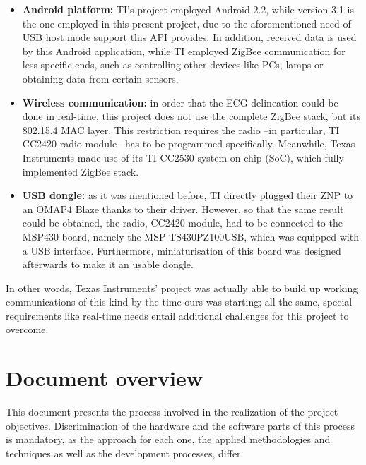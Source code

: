 \begin{itemize}
\begin{itemize}
					\item \textbf{Android platform:} TI's project employed Android 2.2, while version 3.1 is the
						one employed in this present project, due to the aforementioned need of USB host mode support 
						this API provides. In addition, received data is used by this Android application, while TI
						employed ZigBee communication for less specific ends, such as controlling other devices
						like PCs, lamps or obtaining data from certain sensors.
					\item \textbf{Wireless communication:} in order that the ECG delineation could be done in
						real-time, this project does not use the complete ZigBee stack, but its 802.15.4 MAC
						layer. This restriction requires the radio --in particular, TI CC2420 radio module-- has
						to be programmed specifically. Meanwhile, Texas Instruments made use of its TI CC2530 system on chip (SoC), which fully implemented ZigBee stack.
					\item \textbf{USB dongle:} as it was mentioned before, TI directly plugged their ZNP to an
						OMAP4 Blaze thanks to their driver. However, so that the same result could be obtained,
						the radio, CC2420 module, had to be connected to the MSP430 board, namely the MSP-TS430PZ100USB,
						which was equipped with a USB interface. Furthermore, miniaturisation of this board was
						designed afterwards to make it an usable dongle.
				\end{itemize}
				In other words, Texas Instruments' project was actually able to build up working communications
				of this kind by the time ours was starting; all the same, special requirements like real-time
				needs entail additional challenges for this project to overcome.
		\end{itemize}
	
	\section{Document overview}
	\label{sec:prj-oview}
		This document presents the process involved in the realization of the project objectives. Discrimination of the hardware and the software parts of this process is mandatory, as the approach for each one, the applied methodologies and techniques as well as the development processes, differ.\\

